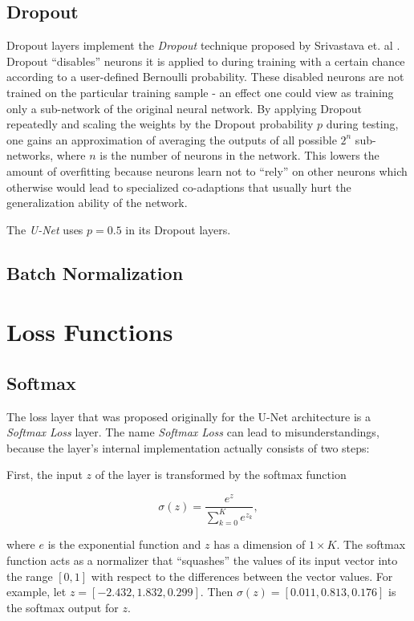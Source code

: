 		\subsection {Dropout}
Dropout layers implement the \textit{Dropout} technique proposed by Srivastava et. al \cite{dropout}. Dropout ``disables'' neurons it is applied to during training with a certain chance according to a user-defined Bernoulli probability. These disabled neurons are not trained on the particular training sample - an effect one could view as training only a sub-network of the original neural network. By applying Dropout repeatedly and scaling the weights by the Dropout probability $p$ during testing, one gains an approximation of averaging the outputs of all possible $2^n$ sub-networks, where $n$ is the number of neurons in the network. This lowers the amount of overfitting because neurons learn not to ``rely'' on other neurons which otherwise would lead to specialized co-adaptions that usually hurt the generalization ability of the network.

The \textit{U-Net} uses $p = 0.5$ in its Dropout layers.



		\subsection {Batch Normalization}




	\section {Loss Functions}

		\subsection{Softmax}
\label{subsec:softmax}

The loss layer that was proposed originally for the U-Net architecture is a \textit{Softmax Loss} layer. The name \textit{Softmax Loss} can lead to misunderstandings, because the layer's internal implementation actually consists of two steps:

First, the input $z$ of the layer is transformed by the softmax function

\[\sigma(z) = \frac{e^{z}}{\sum_{k=0}^{K} e^{z_k}},\]

\noindent where $e$ is the exponential function and $z$ has a dimension of $1 \times K$. The softmax function acts as a normalizer that ``squashes'' the values of its input vector into the range $[0, 1]$ with respect to the differences between the vector values. For example, let $z = [-2.432, 1.832, 0.299]$. Then $\sigma(z) = [0.011, 0.813, 0.176]$ is the softmax output for $z$.

